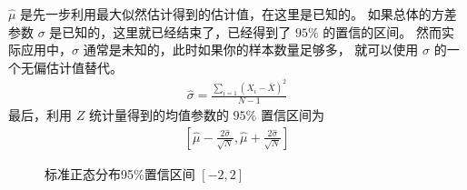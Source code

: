 \documentclass[letterpaper,10pt,english]{sphinxmanual}
\begin{document}
\(\hat{\mu}\) 是先一步利用最大似然估计得到的估计值，在这里是已知的。
如果总体的方差参数 \(\sigma\) 是已知的，这里就已经结束了，已经得到了 \(95\%\) 的置信的区间。
然而实际应用中，\(\sigma\) 通常是未知的，此时如果你的样本数量足够多，
就可以使用 \(\sigma\) 的一个无偏估计值替代。
\begin{equation}\label{equation:推断与检验/content:推断与检验/content:78}
\begin{split}\hat{\sigma} = \frac{\sum_{i=1}  (X_i - \bar{X})^2  }{N-1}\end{split}
\end{equation}
最后，利用 \(Z\) 统计量得到的均值参数的 \(95\%\) 置信区间为
\begin{equation}\label{equation:推断与检验/content:推断与检验/content:79}
\begin{split}\left [ \hat{\mu} - \frac{2 \hat{\sigma}}{\sqrt{N}} ,\hat{\mu} + \frac{2 \hat{\sigma} }{\sqrt{N}} \right ]\end{split}
\end{equation}
\begin{figure}[htbp]
\centering
\capstart

\noindent{}
\caption{标准正态分布95\%置信区间 \([-2,2]\)}\label{\detokenize{_u63a8_u65ad_u4e0e_u68c0_u9a8c/content:id27}}\label{\detokenize{_u63a8_u65ad_u4e0e_u68c0_u9a8c/content:id17}}\end{figure}
\end{document}

